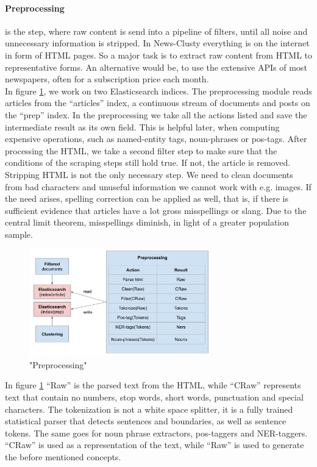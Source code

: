   \paragraph{Preprocessing} is the step, where raw content is send into a pipeline of filters, until all noise and unnecessary information is stripped. In News-Clusty everything is on the internet in form of HTML pages. So a major task is to extract raw content from HTML to representative forms. An alternative would be, to use the extensive APIs of most newspapers, often for a subscription price each month.\\
  In figure \ref{preprocessing}, we work on two Elasticsearch indices. The preprocessing module reads articles from the ``articles'' index, a continuous stream of documents and posts on the ``prep'' index. In the preprocessing we take all the actions listed and save the intermediate result as its own field. This is helpful later, when computing expensive operations, such as named-entity tags, noun-phrases or pos-tags. After processing the HTML, we take a second filter step to make sure that the conditions of the scraping steps still hold true. If not, the article is removed. Stripping HTML is not the only necessary step. We need to clean documents from bad characters and unuseful information we cannot work with e.g. images. If the need arises, spelling correction can be applied as well, that is, if there is sufficient evidence that articles have a lot gross misspellings or slang. Due to the central limit theorem, misspellings diminish, in light of a greater population sample.

    \begin{figure}[h!]
      \centering
        \includegraphics[width=0.7\textwidth]{preprocessing.png}
        \caption{"Preprocessing"}
        \label{preprocessing}
    \end{figure} 

  In figure \ref{preprocessing} ``Raw'' is the parsed text from the HTML, while ``CRaw'' represents text that contain no numbers, stop words, short words, punctuation and special characters. The tokenization is not a white space splitter, it is a fully trained statistical parser that detects sentences and boundaries, as well as sentence tokens. The same goes for noun phrase extractors, pos-taggers and NER-taggers. ``CRaw'' is used as a representation of the text, while ``Raw'' is used to generate the before mentioned concepts.

